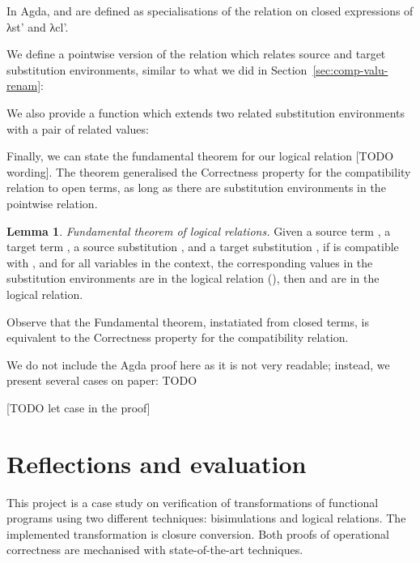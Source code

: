 \documentclass[bsc,frontabs,oneside,singlespacing,parskip,deptreport]{infthesis}
\theoremstyle{definition}
\theoremstyle{lemma}
\newtheorem*{lemma}{Lemma}
\begin{document}
In Agda,  and  are defined as specialisations of the
 relation on closed expressions of λst' and λcl'.


We define a pointwise version of the  relation which
relates source and target substitution environments, similar to what
we did in Section~\ref{sec:comp-valu-renam}:


We also provide a function  which extends two related
substitution environments with a pair of related values:


Finally, we can state the fundamental theorem for our logical
relation [TODO wording]. The theorem generalised the Correctness
property for the compatibility relation to open terms, as long as
there are substitution environments in the pointwise relation.

\begin{lemma}
  \emph{Fundamental theorem of logical relations.} Given a source
  term , a target term , a source substitution
  , and a target substitution , if  is
  compatible with , and for all variables  in the
  context, the corresponding values in the substitution environments
  are in the logical relation (), then
   and  are in the
  logical relation.
\end{lemma}


Observe that the Fundamental theorem, instatiated from closed terms,
is equivalent to the Correctness property for the compatibility relation.

We do not include the Agda proof here as it is not very readable;
instead, we present several cases on paper: TODO

[TODO let case in the proof]

\chapter{Reflections and evaluation}
\label{cha:refl-eval}

This project is a case study on verification of transformations of
functional programs using two different techniques: bisimulations and
logical relations. The implemented transformation is closure
conversion. Both proofs of operational correctness are mechanised with
state-of-the-art techniques.
\end{document}
